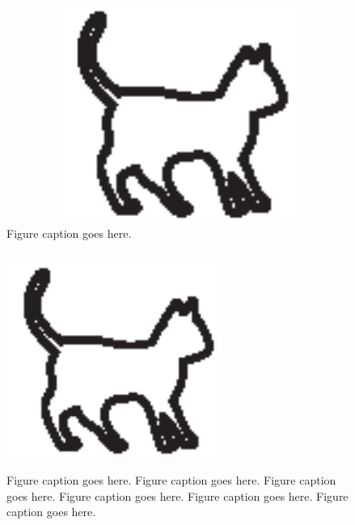 \begin{figure}
\includegraphics[width=350pt, height=200pt]{chapters/chapter1/figures/cat.eps}
\caption[List of figure caption goes here]{Figure caption goes here.}
\end{figure}



\begin{figure}[htb]
\includegraphics[width=200pt, height=200pt]{chapters/chapter1/figures/cat}
\caption[Short figure caption]{Figure caption goes here. Figure caption goes here.
Figure caption goes here. Figure caption goes here. Figure caption goes here.
Figure caption goes here.}
\end{figure}






